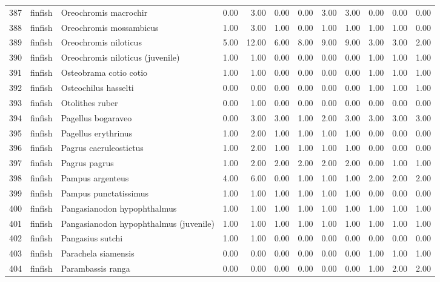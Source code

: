 \begin{table}[ht]
\begin{tabular}{rllrrrrrrrrr}
  387 & finfish & Oreochromis macrochir & 0.00 & 3.00 & 0.00 & 0.00 & 3.00 & 3.00 & 0.00 & 0.00 & 0.00 \\ 
  388 & finfish & Oreochromis mossambicus & 1.00 & 3.00 & 1.00 & 0.00 & 1.00 & 1.00 & 1.00 & 1.00 & 0.00 \\ 
  389 & finfish & Oreochromis niloticus & 5.00 & 12.00 & 6.00 & 8.00 & 9.00 & 9.00 & 3.00 & 3.00 & 2.00 \\ 
  390 & finfish & Oreochromis niloticus (juvenile) & 1.00 & 1.00 & 0.00 & 0.00 & 0.00 & 0.00 & 1.00 & 1.00 & 1.00 \\ 
  391 & finfish & Osteobrama cotio cotio & 1.00 & 1.00 & 0.00 & 0.00 & 0.00 & 0.00 & 1.00 & 1.00 & 1.00 \\ 
  392 & finfish & Osteochilus hasselti & 0.00 & 0.00 & 0.00 & 0.00 & 0.00 & 0.00 & 1.00 & 1.00 & 1.00 \\ 
  393 & finfish & Otolithes ruber & 0.00 & 1.00 & 0.00 & 0.00 & 0.00 & 0.00 & 0.00 & 0.00 & 0.00 \\ 
  394 & finfish & Pagellus bogaraveo & 0.00 & 3.00 & 3.00 & 1.00 & 2.00 & 3.00 & 3.00 & 3.00 & 3.00 \\ 
  395 & finfish & Pagellus erythrinus & 1.00 & 2.00 & 1.00 & 1.00 & 1.00 & 1.00 & 0.00 & 0.00 & 0.00 \\ 
  396 & finfish & Pagrus caeruleostictus & 1.00 & 2.00 & 1.00 & 1.00 & 1.00 & 1.00 & 0.00 & 0.00 & 0.00 \\ 
  397 & finfish & Pagrus pagrus & 1.00 & 2.00 & 2.00 & 2.00 & 2.00 & 2.00 & 0.00 & 1.00 & 1.00 \\ 
  398 & finfish & Pampus argenteus & 4.00 & 6.00 & 0.00 & 1.00 & 1.00 & 1.00 & 2.00 & 2.00 & 2.00 \\ 
  399 & finfish & Pampus punctatissimus & 1.00 & 1.00 & 1.00 & 1.00 & 1.00 & 1.00 & 0.00 & 0.00 & 0.00 \\ 
  400 & finfish & Pangasianodon hypophthalmus & 1.00 & 1.00 & 1.00 & 1.00 & 1.00 & 1.00 & 1.00 & 1.00 & 1.00 \\ 
  401 & finfish & Pangasianodon hypophthalmus (juvenile) & 1.00 & 1.00 & 1.00 & 1.00 & 1.00 & 1.00 & 1.00 & 1.00 & 1.00 \\ 
  402 & finfish & Pangasius sutchi & 1.00 & 1.00 & 0.00 & 0.00 & 0.00 & 0.00 & 0.00 & 0.00 & 0.00 \\ 
  403 & finfish & Parachela siamensis & 0.00 & 0.00 & 0.00 & 0.00 & 0.00 & 0.00 & 1.00 & 1.00 & 1.00 \\ 
  404 & finfish & Parambassis ranga & 0.00 & 0.00 & 0.00 & 0.00 & 0.00 & 0.00 & 1.00 & 2.00 & 2.00 \\ 

\end{tabular}
\end{table}
